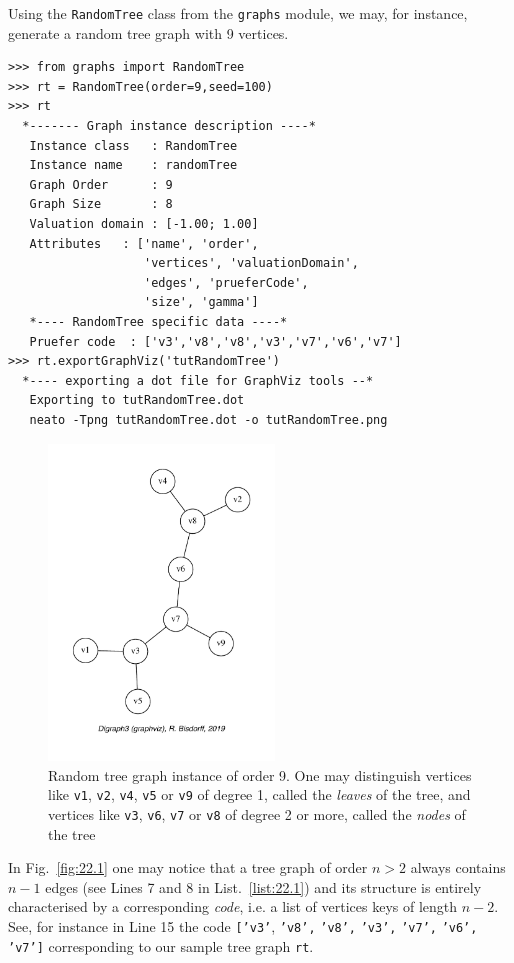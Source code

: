 Using the \texttt{RandomTree} class from the \texttt{graphs} module, we may, for instance, generate a random tree graph with 9 vertices.
\begin{lstlisting}[caption={Generating a random tree graph},label=list:22.1]
>>> from graphs import RandomTree
>>> rt = RandomTree(order=9,seed=100)
>>> rt
  *------- Graph instance description ----*
   Instance class   : RandomTree
   Instance name    : randomTree
   Graph Order      : 9
   Graph Size       : 8
   Valuation domain : [-1.00; 1.00]
   Attributes   : ['name', 'order',
                   'vertices', 'valuationDomain',
                   'edges', 'prueferCode',
                   'size', 'gamma']
   *---- RandomTree specific data ----*
   Pruefer code  : ['v3','v8','v8','v3','v7','v6','v7']
>>> rt.exportGraphViz('tutRandomTree')
  *---- exporting a dot file for GraphViz tools --*
   Exporting to tutRandomTree.dot
   neato -Tpng tutRandomTree.dot -o tutRandomTree.png
\end{lstlisting}
\begin{figure}[ht]
\sidecaption[t]
\includegraphics[width=6cm]{Figures/22-1-tutRandomTree.pdf}
\caption[Random tree graph instance of order 9]{Random tree graph instance of order 9. One may distinguish vertices like \texttt{v1}, \texttt{v2}, \texttt{v4}, \texttt{v5} or \texttt{v9}  of degree 1, called the \emph{leaves} of the tree, and vertices like \texttt{v3}, \texttt{v6}, \texttt{v7} or \texttt{v8} of degree 2 or more, called the \emph{nodes} of the tree} 
\label{fig:22.1}       %
\end{figure}

In Fig.~\vref{fig:22.1} one may notice that a tree graph of order $n > 2$ always contains $n-1$ edges (see Lines 7 and 8 in List.~\vref{list:22.1}) and its structure is entirely characterised by a corresponding \Pruefer \emph{code}, i.e. a list of vertices keys of length $n-2$. See, for instance in Line 15 the code \texttt{['v3'}, \texttt{'v8',} \texttt{'v8',} \texttt{'v3',} \texttt{'v7',} \texttt{'v6',} \texttt{'v7']} corresponding to our sample tree graph \texttt{rt}.

